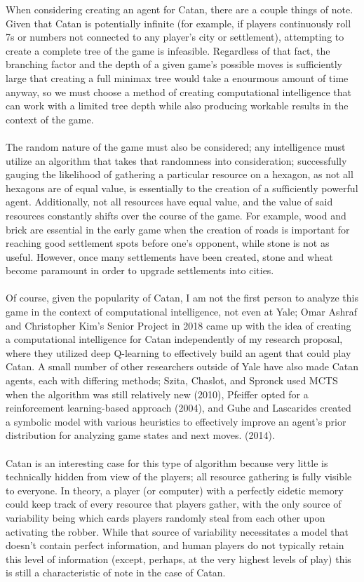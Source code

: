 \documentclass[a4paper, 11pt]{article}
\begin{document}
When considering creating an agent for Catan, there are a couple things of note. Given that Catan is potentially infinite (for example, if players continuously roll 7s or numbers not connected to any player's city or settlement), attempting to create a complete tree of the game is infeasible. Regardless of that fact, the branching factor and the depth of a given game's possible moves is sufficiently large that creating a full minimax tree would take a enourmous amount of time anyway, so we must choose a method of creating computational intelligence that can work with a limited tree depth while also producing workable results in the context of the game.
\\ \\ 
\noindent The random nature of the game must also be considered; any intelligence must utilize an algorithm that takes that randomness into consideration; successfully gauging the likelihood of gathering a particular resource on a hexagon, as not all hexagons are of equal value, is essentially to the creation of a sufficiently powerful agent. Additionally, not all resources have equal value, and the value of said resources constantly shifts over the course of the game. For example, wood and brick are essential in the early game when the creation of roads is important for reaching good settlement spots before one's opponent, while stone is not as useful. However, once many settlements have been created, stone and wheat become paramount in order to upgrade settlements into cities.
\\ \\
\noindent Of course, given the popularity of Catan, I am not the first person to analyze this game in the context of computational intelligence, not even at Yale; Omar Ashraf and Christopher Kim's Senior Project in 2018 came up with the idea of creating a computational intelligence for Catan independently of my research proposal, where they utilized deep Q-learning to effectively build an agent that could play Catan. A small number of other researchers outside of Yale have also made Catan agents, each with differing methods; Szita, Chaslot, and Spronck used MCTS when the algorithm was still relatively new (2010), Pfeiffer opted for a reinforcement learning-based approach (2004), and Guhe and Lascarides created a symbolic model with various heuristics to effectively improve an agent's prior distribution for analyzing game states and next moves.
(2014).
\\ \\ 
\noindent Catan is an interesting case for this type of algorithm because very little is technically hidden from view of the players; all resource gathering is fully visible to everyone. In theory, a player (or computer) with a perfectly eidetic memory could keep track of every resource that players gather, with the only source of variability being which cards players randomly steal from each other upon activating the robber. While that source of variability necessitates a model that doesn't contain perfect information, and human players do not typically retain this level of information (except, perhaps, at the very highest levels of play) this is still a characteristic of note in the case of Catan.
\end{document}

